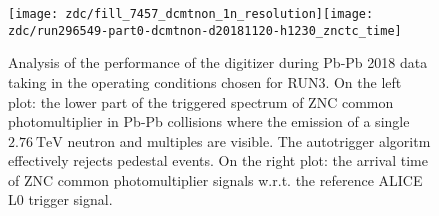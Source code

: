 \begin{figure}
    \texttt{[image: zdc/fill\_7457\_dcmtnon\_1n\_resolution]}\texttt{[image: zdc/run296549-part0-dcmtnon-d20181120-h1230\_znctc\_time]}

    \caption{\label{fig:zdc-signals}Analysis of the performance of the digitizer during Pb-Pb 2018 data taking in the operating conditions chosen for RUN3. On the left plot: the lower part of the triggered spectrum of ZNC common photomultiplier in Pb-Pb collisions where the emission of a single $\SI{2.76}{\tera\electronvolt}$ neutron  and multiples are visible. The autotrigger algoritm effectively rejects pedestal events. On the right plot: the arrival time of ZNC common photomultiplier
    signals w.r.t. the reference ALICE L0 trigger signal.}
\end{figure}
    
    
